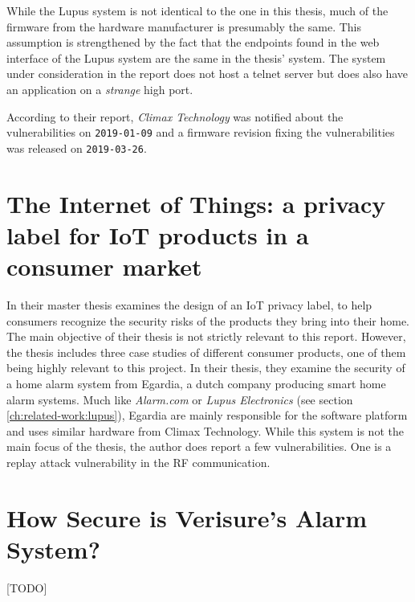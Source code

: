 While the Lupus system is not identical to the one in this thesis, much of the firmware from the hardware manufacturer is presumably the same. This assumption is strengthened by the fact that the endpoints found in the web interface of the Lupus system are the same in the thesis' system. The system under consideration in the report does not host a telnet server but does also have an application on a \textit{strange} high port.

According to their report, \textit{Climax Technology} was notified about the vulnerabilities on \texttt{2019-01-09} and a firmware revision fixing the vulnerabilities was released on \texttt{2019-03-26}.

\section{The Internet of Things: a privacy label for IoT products in a consumer market}
In their master thesis \citeauthor{iotprivacylabel} examines the design of an IoT privacy label, to help consumers recognize the security risks of the products they bring into their home. The main objective of their thesis is not strictly relevant to this report. However, the thesis includes three case studies of different consumer products, one of them being highly relevant to this project. In their thesis, they examine the security of a home alarm system from Egardia, a dutch company producing smart home alarm systems. Much like \textit{Alarm.com} or \textit{Lupus Electronics} (see section \ref{ch:related-work:lupus}), Egardia are mainly responsible for the software platform and uses similar hardware from Climax Technology. While this system is not the main focus of the thesis, the author does report a few vulnerabilities. One is a replay attack vulnerability in the \gls{RF} communication.

\section{How Secure is Verisure’s Alarm System?}
[TODO] \cite{verisurethesis}